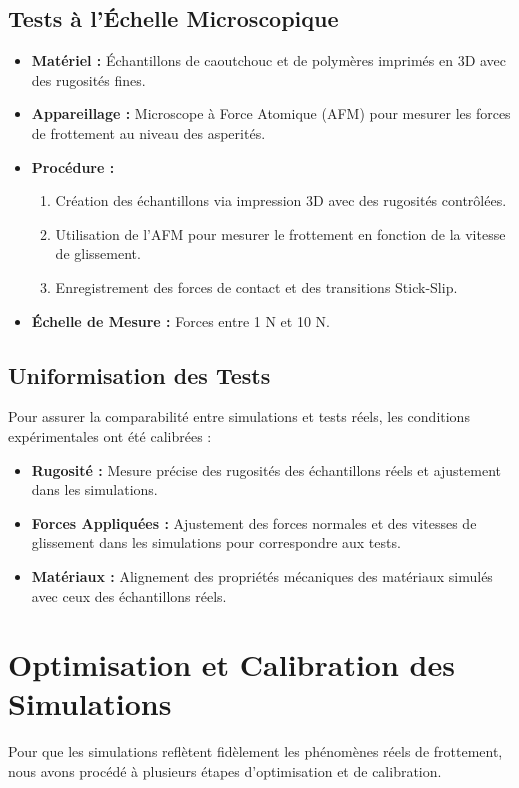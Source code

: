 \subsection{Tests à l'Échelle Microscopique}
\begin{itemize}
    \item \textbf{Matériel :} Échantillons de caoutchouc et de polymères imprimés en 3D avec des rugosités fines.
    \item \textbf{Appareillage :} Microscope à Force Atomique (AFM) pour mesurer les forces de frottement au niveau des asperités.
    \item \textbf{Procédure :}
    \begin{enumerate}
        \item Création des échantillons via impression 3D avec des rugosités contrôlées.
        \item Utilisation de l'AFM pour mesurer le frottement en fonction de la vitesse de glissement.
        \item Enregistrement des forces de contact et des transitions Stick-Slip.
    \end{enumerate}
    \item \textbf{Échelle de Mesure :} Forces entre 1 N et 10 N.
\end{itemize}

\subsection{Uniformisation des Tests}
Pour assurer la comparabilité entre simulations et tests réels, les conditions expérimentales ont été calibrées :
\begin{itemize}
    \item \textbf{Rugosité :} Mesure précise des rugosités des échantillons réels et ajustement dans les simulations.
    \item \textbf{Forces Appliquées :} Ajustement des forces normales et des vitesses de glissement dans les simulations pour correspondre aux tests.
    \item \textbf{Matériaux :} Alignement des propriétés mécaniques des matériaux simulés avec ceux des échantillons réels.
\end{itemize}

\section{Optimisation et Calibration des Simulations}
Pour que les simulations reflètent fidèlement les phénomènes réels de frottement, nous avons procédé à plusieurs étapes d'optimisation et de calibration.

